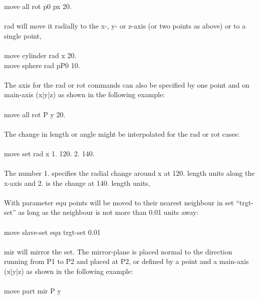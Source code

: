 \documentclass{article}
\begin{document}
move all rot p0 px 20.\\\\
rad will move it radially to the x-, y- or z-axis (or two points as above) or to a single point,\\\\
move cylinder rad x 20.\\
move sphere rad pP0 10.\\\\
The axis for the rad or rot commands can also be specified by one point and on main-axis (x|y|z) as shown in the following example:\\\\
move all rot P y 20.\\\\
The change in length or angle might be interpolated for the rad or rot cases:\\\\
move set rad x 1. 120. 2. 140.\\\\
The number 1. specifies the radial change around x at 120. length units along the x-axis and 2. is the change at 140. length units,\\\\
With parameter equ points will be moved to their nearest neighbour in set ``trgt-set'' as long as the neighbour is not more than 0.01 units away:\\\\
move slave-set equ trgt-set 0.01\\\\
mir will mirror the set. The mirror-plane is placed normal to the direction running from P1 to P2 and placed at P2, or defined by a point and a main-axis (x|y|z) as shown in the following example:\\\\
move part mir P y
\end{document}
